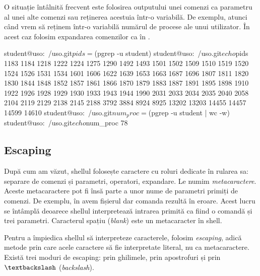 O situație întâlnită frecvent este folosirea outputului unei comenzi ca parametru al unei alte comenzi sau reținerea acestuia într-o variabilă.
De exemplu, atunci când vrem să reținem într-o variabilă numărul de procese ale unui utilizator.
În acest caz folosim expandarea comenzilor ca în .

\begin{screen}[caption={Expandarea comenzilor},label={lst:cli:comm-expansion}]
student@uso:~/uso.git$ pids=$(pgrep -u student)
student@uso:~/uso.git$ echo $pids
1183 1184 1218 1222 1224 1275 1290 1492 1493 1501 1502 1509 1510 1519 1520 1524 1526 1531 1534 1601 1606 1622 1639 1653 1663 1687 1696 1807 1811 1820 1830 1844 1848 1852 1857 1861 1866 1870 1879 1883 1887 1891 1895 1898 1910 1922 1926 1928 1929 1930 1933 1943 1944 1990 2031 2033 2034 2035 2040 2058 2104 2119 2129 2138 2145 2188 3792 3884 8924 8925 13202 13203 14455 14457 14599 14610
student@uso:~/uso.git$ num_proc=$(pgrep -u student | wc -w)
student@uso:~/uso.git$ echo $num_proc
78
\end{screen}

\subsection{Escaping}
\label{sec:cli:shell-func:escaping}

După cum am văzut, shellul folosește caractere cu roluri dedicate în rularea sa:
separare de comenzi și parametri, operatori, expandare.
Le numim \textit{metacaractere}.
Aceste metacaractere pot
fi însă parte a unor nume de parametri primiți de comenzi.
De exemplu, în  avem
fișierul  dar comanda rezultă în eroare.
Acest lucru se întâmplă deoarece shellul interpretează intrarea primită ca fiind o comandă și trei parametri.
Caracterul spațiu (\textit{blank}) este un metacaracter în shell.


Pentru a împiedica shellul să interpreteze caracterele, folosim \textit{escaping}, adică metode prin care acele caractere să fie interpretate literal, nu ca metacaractere.
Există trei moduri de escaping: prin ghilimele, prin apostrofuri și prin \texttt{$\textbackslash$} (\textit{backslash}).

